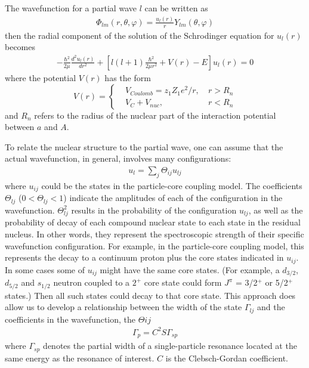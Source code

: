 The wavefunction for a partial wave $l$ can be written as
\begin{equation}
    \label{wave_function}
    \begin{aligned}
        \Phi_{lm}(r,\theta, \varphi)=\frac{u_l(r)}{r} Y_{lm}(\theta, \varphi)
    \end{aligned}
\end{equation}
then the radial component of the solution of the Schrodinger equation for $u_l(r)$ becomes
\begin{equation}
    \label{ul}
    \begin{aligned}
        -\frac{\hbar^2}{2 \mu} \frac{d^2 u_l(r)}{dr^2} + [l(l+1)\frac{\hbar^2}{2\mu r^2}+ V(r) -E]u_l(r) =0
    \end{aligned}
\end{equation}
where the potential $V(r)$ has the form
\begin{equation}
    \label{Vr}
    V(r)=\left\{
    \begin{aligned}
    &V_{Coulomb} = z_1 Z_1 e^2/r, \ &r>R_n  \\
    &V_C + V_{nuc}, \  &r<R_n
    \end{aligned}
    \right.
\end{equation}
and $R_n$ refers to the radius of the nuclear part of the interaction potential between $a$ and $A$.

To relate the nuclear structure to the partial wave, one can assume that the actual wavefunction, in general, involves many configurations:
\begin{equation}
    \label{configuration}
    \begin{aligned}
    u_l = \sum_j \Theta_{ij} u_{lj}
    \end{aligned}
\end{equation}
where ${u_{ij}}$ could be the states in the particle-core coupling model. The coefficients $\Theta_{lj}$ ($0<\Theta_{lj}<1$) indicate the amplitudes of each of the configuration in the wavefunction. $\Theta^2_{lj}$ results in the probability of the configuration $u_{lj}$, as well as the probability of decay of each compound nuclear state to each state in the residual nucleus. In other words, they represent the spectroscopic strength of their specific wavefunction configuration. For example, in the particle-core coupling model, this  represents the decay to a continuum proton plus the core states indicated in $u_{ij}$. In some cases some of $u_{ij}$ might have the same core states. (For example, a $d_{3/2}$, $d_{5/2}$ and $s_{1/2}$ neutron coupled to a $2^+$ core state could form $J^{\pi}$ = 3/2${^+}$ or 5/2$^{+}$ states.) Then all such states could decay to that core state. This approach does allow us to develop a relationship between the width of the state $\Gamma_{lj}$ and the coefficients in the wavefunction, the $\Theta{ij}$
\begin{equation}
    \label{spectroscopic_relation}
    \begin{aligned}
    \Gamma_p = C^2S \Gamma_{sp}
    \end{aligned}
\end{equation}
where $\Gamma_{sp}$ denotes the partial width of a single-particle resonance located at the same energy as the resonance of interest. $C$ is the Clebsch-Gordan coefficient.


